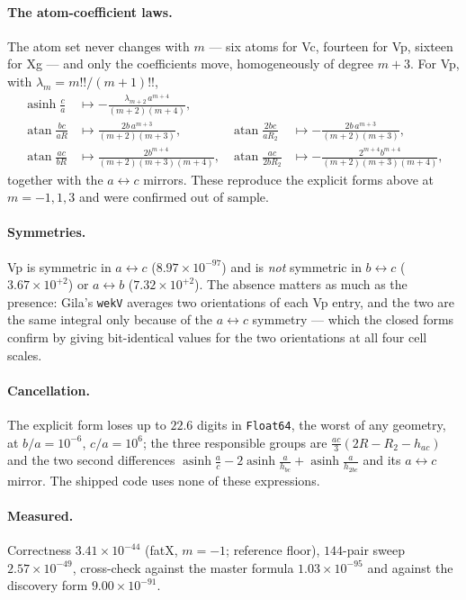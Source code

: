 \documentclass[11pt]{article}
\theoremstyle{remark}
\newcommand{\asinh}{\operatorname{asinh}}
\newcommand{\atan}{\operatorname{atan}}
\newcommand{\code}[1]{\texttt{#1}}
\begin{document}
\paragraph{The atom-coefficient laws.} The atom set never changes with $m$ --- six atoms
for Vc, fourteen for Vp, sixteen for Xg --- and only the coefficients move, homogeneously
of degree $m+3$. For Vp, with $\lambda_m = m!!/(m+1)!!$,
\begin{equation}
\boxed{\;
\begin{aligned}
\asinh\tfrac{c}{a} &\longmapsto -\frac{\lambda_{m+2}\,a^{m+4}}{(m+2)(m+4)}, & & \\
\atan\tfrac{bc}{aR} &\longmapsto \frac{2b\,a^{m+3}}{(m+2)(m+3)}, &
\atan\tfrac{2bc}{aR_2} &\longmapsto -\frac{2b\,a^{m+3}}{(m+2)(m+3)},\\
\atan\tfrac{ac}{bR} &\longmapsto \frac{2b^{m+4}}{(m+2)(m+3)(m+4)}, &
\atan\tfrac{ac}{2bR_2} &\longmapsto -\frac{2^{m+4}b^{m+4}}{(m+2)(m+3)(m+4)},
\end{aligned}\;}
\end{equation}
together with the $a\leftrightarrow c$ mirrors. These reproduce the explicit forms above at
$m = -1, 1, 3$ and were confirmed out of sample.

\paragraph{Symmetries.} Vp is symmetric in $a\leftrightarrow c$ ($8.97\times10^{-97}$) and
is \emph{not} symmetric in $b\leftrightarrow c$ ($3.67\times10^{+2}$) or
$a\leftrightarrow b$ ($7.32\times10^{+2}$). The absence matters as much as the presence:
Gila's \code{wekV} averages two orientations of each Vp entry, and the two are the same
integral only because of the $a\leftrightarrow c$ symmetry --- which the closed forms
confirm by giving bit-identical values for the two orientations at all four cell scales.

\paragraph{Cancellation.} The explicit form loses up to $22.6$ digits in \code{Float64},
the worst of any geometry, at $b/a = 10^{-6}$, $c/a = 10^{6}$; the three responsible groups
are $\tfrac{ac}{3}(2R - R_2 - h_{ac})$ and the two second differences
$\asinh\tfrac{a}{c} - 2\asinh\tfrac{a}{h_{bc}} + \asinh\tfrac{a}{h_{2bc}}$ and its
$a\leftrightarrow c$ mirror. The shipped code uses none of these expressions.

\paragraph{Measured.} Correctness $3.41\times10^{-44}$ (fatX, $m=-1$; reference floor),
$144$-pair sweep $2.57\times10^{-49}$, cross-check against the master formula
$1.03\times10^{-95}$ and against the discovery form $9.00\times10^{-91}$.
\end{document}
